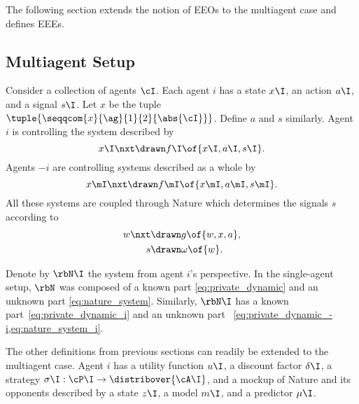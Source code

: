 The following section extends the notion of EEOs to the multiagent case and defines EEEs.

\subsection{Multiagent Setup}

Consider a collection of agents \(\cI\).
Each agent \(i\) has a state \(x\I\), an action \(a\I\), and a signal \(s\I\).
Let \(x\) be the tuple \(\tuple{\seqqcom{x}{\ag}{1}{2}{\abs{\cI}}}\).
Define \(a\) and \(s\) similarly.
Agent \(i\) is controlling the system described by
\begin{equation}
\label{eq:private_dynamic_i}
x\I\nxt \drawn  f\I \of{x\I, a\I, s\I}.
\end{equation}
Agents \(-i\) are controlling systems described as a whole by
\begin{equation}
\label{eq:private_dynamic_-i}
x\mI\nxt \drawn  f\mI \of{x\mI, a\mI, s\mI}.
\end{equation}
All these systems are coupled through Nature which determines the signals \(s\) according to
\begin{subequations}
\label{eq:nature_system_i}
\begin{align}
\label{eq:nature_dynamic_i}
w\nxt &\drawn g \of{w, x, a}, \\
\label{eq:nature_signal_i}
s &\drawn \omega \of{w}.
\end{align}
\end{subequations}

Denote by \(\rbN\I\) the system from agent \(i\)'s perspective.
In the single-agent setup, \(\rbN\) was composed of a known part \cref{eq:private_dynamic} and an unknown part \cref{eq:nature_system}.
Similarly, \(\rbN\I\) has a known part~\cref{eq:private_dynamic_i} and an unknown part~ \cref{eq:private_dynamic_-i,eq:nature_system_i}.

The other definitions from previous sections can readily be extended to the multiagent case.
Agent \(i\) has a utility function \(u\I\), a discount factor \(\delta\I\), a strategy \(\sigma\I : \cP\I \to \distribover{\cA\I}\), and a mockup of Nature and its opponents described by a state \(z\I\), a model \(m\I\), and a predictor \(\mu\I\).


